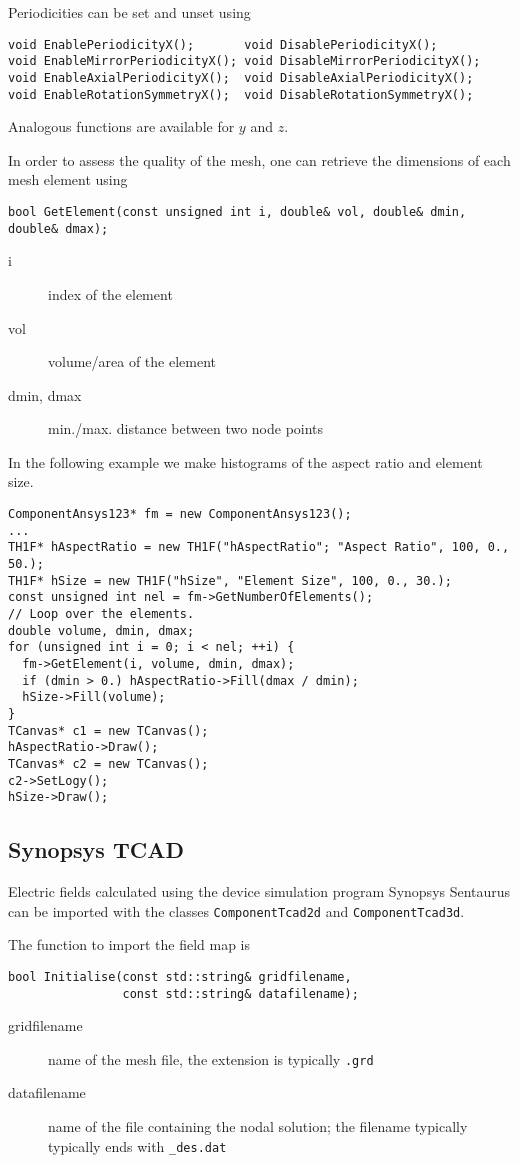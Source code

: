 Periodicities can be set and unset using
\begin{lstlisting}
void EnablePeriodicityX();       void DisablePeriodicityX();
void EnableMirrorPeriodicityX(); void DisableMirrorPeriodicityX();
void EnableAxialPeriodicityX();  void DisableAxialPeriodicityX();
void EnableRotationSymmetryX();  void DisableRotationSymmetryX();
\end{lstlisting}
Analogous functions are available for \(y\) and \(z\).

In order to assess the quality of the mesh, 
one can retrieve the dimensions of each mesh element using
\begin{lstlisting}
bool GetElement(const unsigned int i, double& vol, double& dmin, double& dmax);
\end{lstlisting}
\begin{description}
\item[i] index of the element
\item[vol] volume/area of the element
\item[dmin, dmax] min./max. distance between two node points
\end{description}

In the following example we make histograms of the aspect ratio and 
element size.
\begin{lstlisting}
ComponentAnsys123* fm = new ComponentAnsys123();
...
TH1F* hAspectRatio = new TH1F("hAspectRatio"; "Aspect Ratio", 100, 0., 50.);
TH1F* hSize = new TH1F("hSize", "Element Size", 100, 0., 30.);
const unsigned int nel = fm->GetNumberOfElements();
// Loop over the elements.
double volume, dmin, dmax;
for (unsigned int i = 0; i < nel; ++i) {
  fm->GetElement(i, volume, dmin, dmax);
  if (dmin > 0.) hAspectRatio->Fill(dmax / dmin);
  hSize->Fill(volume);
}
TCanvas* c1 = new TCanvas();
hAspectRatio->Draw();
TCanvas* c2 = new TCanvas();
c2->SetLogy();
hSize->Draw();
\end{lstlisting}

\subsection{Synopsys TCAD}

Electric fields calculated using the device simulation program 
Synopsys Sentaurus \cite{Synopsys} can be imported with the classes 
\texttt{ComponentTcad2d} and \texttt{ComponentTcad3d}.

The function to import the field map is 
\begin{lstlisting}
bool Initialise(const std::string& gridfilename,
                const std::string& datafilename);
\end{lstlisting}
\begin{description}
  \item[gridfilename]
  name of the mesh file, the extension is typically \texttt{.grd}
  \item[datafilename]
  name of the file containing the nodal solution;
  the filename typically typically ends with \texttt{\_des.dat}
\end{description}

